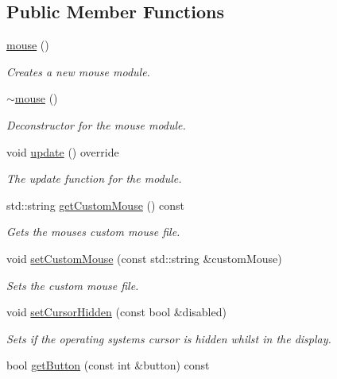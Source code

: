 \subsection*{Public Member Functions}
\begin{DoxyCompactItemize}
\item 
\hyperlink{classflounder_1_1mouse_a60e59355a55844e8ca559e2f6b9c82e9}{mouse} ()
\begin{DoxyCompactList}\small\item\em Creates a new mouse module. \end{DoxyCompactList}\item 
\hyperlink{classflounder_1_1mouse_a3038f39f358e37d15059af6c1675497b}{$\sim$mouse} ()
\begin{DoxyCompactList}\small\item\em Deconstructor for the mouse module. \end{DoxyCompactList}\item 
void \hyperlink{classflounder_1_1mouse_aa1b1d60e1d1cf4ec7d19eaef65e040bc}{update} () override
\begin{DoxyCompactList}\small\item\em The update function for the module. \end{DoxyCompactList}\item 
std\+::string \hyperlink{classflounder_1_1mouse_abf32aff720a25f119c6c0a439357122c}{get\+Custom\+Mouse} () const
\begin{DoxyCompactList}\small\item\em Gets the mouses custom mouse file. \end{DoxyCompactList}\item 
void \hyperlink{classflounder_1_1mouse_ab6b1c2f498e6fdef0a2ff827ef93928a}{set\+Custom\+Mouse} (const std\+::string \&custom\+Mouse)
\begin{DoxyCompactList}\small\item\em Sets the custom mouse file. \end{DoxyCompactList}\item 
void \hyperlink{classflounder_1_1mouse_aff9750c7d68e93aea4c2d3c447677a9e}{set\+Cursor\+Hidden} (const bool \&disabled)
\begin{DoxyCompactList}\small\item\em Sets if the operating systems cursor is hidden whilst in the display. \end{DoxyCompactList}\item 
bool \hyperlink{classflounder_1_1mouse_a86322c7df5401b550b09fbc3ccf1a13e}{get\+Button} (const int \&button) const

\end{DoxyCompactItemize}
